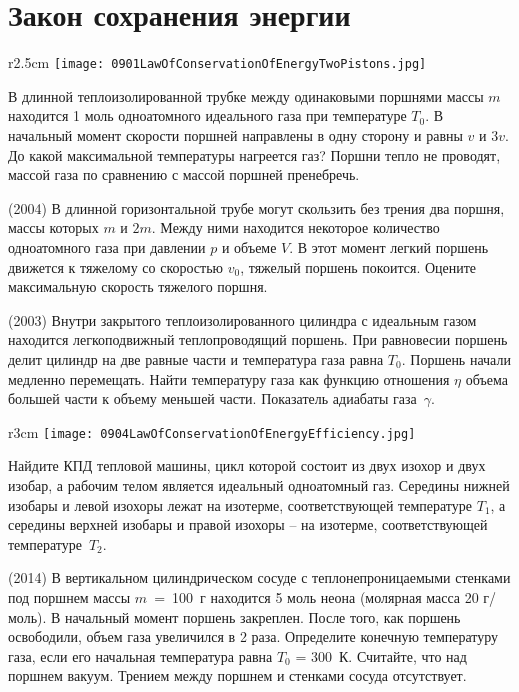 \section{Закон сохранения энергии}

\begin{wrapfigure}{r}{2.5cm}
\texttt{[image: 0901LawOfConservationOfEnergyTwoPistons.jpg]}
\end{wrapfigure}

\AddProb В длинной теплоизолированной трубке между одинаковыми поршнями массы $m$ находится 1 моль одноатомного идеального газа при температуре $T_0$. 
В начальный момент скорости поршней направлены в одну сторону и равны $v$ и $3v$. До какой максимальной температуры нагреется газ? 
Поршни тепло не проводят, массой газа по сравнению с массой поршней пренебречь.

\AddProb (2004) В длинной горизонтальной трубе могут скользить без трения два поршня, массы которых $m$ и $2m$. 
Между ними находится некоторое количество одноатомного газа при давлении $p$ и объеме $V$. 
В этот момент легкий поршень движется к тяжелому со скоростью $v_0$, тяжелый поршень покоится. 
Оцените максимальную скорость тяжелого поршня.

\AddProb (2003) Внутри закрытого теплоизолированного цилиндра с идеальным газом находится легкоподвижный теплопроводящий поршень. 
При равновесии поршень делит цилиндр на две равные части и температура газа равна $T_0$. Поршень начали медленно перемещать. 
Найти температуру газа как функцию отношения $\eta$ объема большей части к объему меньшей части. Показатель адиабаты газа~$\gamma$.

\begin{wrapfigure}{r}{3cm}
\texttt{[image: 0904LawOfConservationOfEnergyEfficiency.jpg]}
\end{wrapfigure}

\AddProb Найдите КПД тепловой машины, цикл которой состоит из двух изохор и двух изобар, а рабочим телом является идеальный одноатомный газ. 
Середины нижней изобары и левой изохоры лежат на изотерме, соответствующей температуре $T_1$, 
а середины верхней изобары и правой изохоры -- на изотерме, соответствующей температуре~$T_2$.

\AddProb (2014) В вертикальном цилиндрическом сосуде с теплонепроницаемыми стенками под поршнем массы $m$~=~100~г находится 5 моль неона 
(молярная масса 20 г/моль). В начальный момент поршень закреплен. После того, как поршень освободили, объем газа увеличился в 2 раза. 
Определите конечную температуру газа, если его начальная температура равна $T_0$ = 300~К. Считайте, что над поршнем вакуум. 
Трением между поршнем и стенками сосуда отсутствует.

